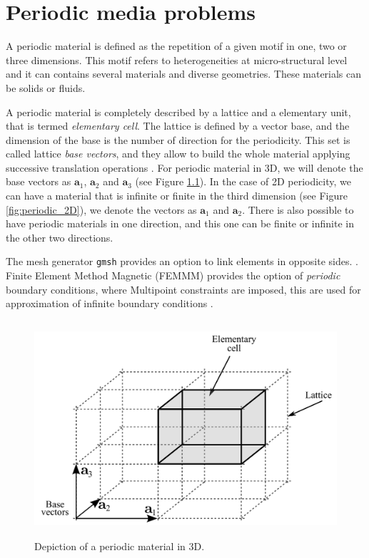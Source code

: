 %
\graphicspath{ {./img/Periodic/} }
\chapter{Periodic media problems}

A periodic material is defined as the repetition of a given motif in one, two or three dimensions. This motif refers to heterogeneities at micro-structural level and it can contains several materials and diverse geometries. These materials can be solids or fluids.

A periodic material is completely described by a lattice and a elementary unit, that is termed \emph{elementary cell}. The lattice is defined by a vector base, and the dimension of the base is the number of direction for the periodicity.  This set is called lattice \emph{base vectors}, and they allow to build the whole material applying successive translation operations \cite{book:brillouin2003}. For periodic material in 3D, we will denote the base vectors as $\mathbf{a}_1$, $\mathbf{a}_2$ and $\mathbf{a}_3$ (see Figure \ref{fig:periodic_3D}). In the case of 2D periodicity, we can have a material that is infinite or finite in the third dimension (see Figure \ref{fig:periodic_2D}), we denote the vectors as $\mathbf{a}_1$ and $\mathbf{a}_2$. There is also possible to have periodic materials in one direction, and this one can be finite or infinite in the other two directions.

The mesh generator \texttt{gmsh} provides an option to link elements in opposite sides.
\cite{gmsh_manual}. Finite Element Method Magnetic (FEMMM) provides the option of \emph{periodic} boundary conditions, where Multipoint constraints are imposed, this are used for approximation of infinite boundary conditions \cite{FEMM_manual}.

\begin{figure}[h]
\centering
\includegraphics[height=8cm]{periodic_3D.pdf} 
\caption{Depiction of a periodic material in 3D.}
\label{fig:periodic_3D}
\end{figure}

